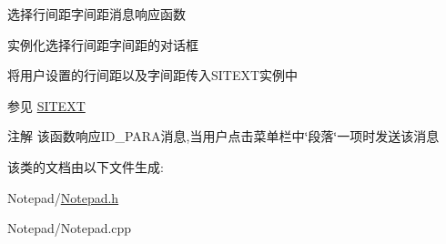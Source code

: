 选择行间距字间距消息响应函数~\newline



\begin{DoxyItemize}
\item 实例化选择行间距字间距的对话框
\item 将用户设置的行间距以及字间距传入\+S\+I\+T\+E\+X\+T实例中 \begin{DoxySeeAlso}{参见}
\hyperlink{class_s_i_t_e_x_t}{S\+I\+T\+E\+XT} 
\end{DoxySeeAlso}
\begin{DoxyNote}{注解}
该函数响应\+I\+D\+\_\+\+P\+A\+R\+A消息,当用户点击菜单栏中\char`\"{}段落\char`\"{}一项时发送该消息 
\end{DoxyNote}

\end{DoxyItemize}

该类的文档由以下文件生成\+:\begin{DoxyCompactItemize}
\item 
Notepad/\hyperlink{_notepad_8h}{Notepad.\+h}\item 
Notepad/Notepad.\+cpp\end{DoxyCompactItemize}
